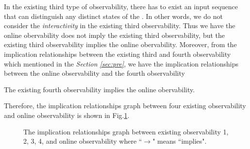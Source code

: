 In the existing third type of observability, there has to exist an input sequence that can distinguish any distinct states of the \BCN. In other words, we do not consider the {\em interactivity} in the existing third observability. Thus we have the online obervability does not imply the existing third observability, but the existing third observability implies the online obervability. Moreover, from the implication relationships between the existing third and fourth observability which mentioned in the {\em Section \ref{sec:pre}}, we have the implication relationships between the online observability and the fourth observability
\begin{theorem}
The existing fourth observability implies the online obervability.
\label{theo:5}
\end{theorem}

Therefore, the implication relationships graph between four existing observability and online observability is shown in Fig.\ref{fig:7}.

\begin{figure}[thpb]
      \centering
      
      \caption{The implication relationships graph between existing observability 1, 2, 3, 4, and online observability where ``$\rightarrow$" means ``implies".}
      \label{fig:7}
   \end{figure}

